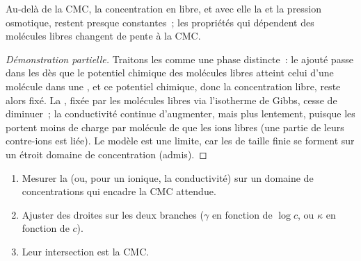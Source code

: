 \begin{proposition}\label{prop:b3:colloids:cmc-break}
Au-delà de la CMC, la concentration en  libre, et avec elle
la  et la pression osmotique, restent presque
constantes~; les propriétés qui dépendent des molécules libres changent
de pente à la CMC.
\end{proposition}

\begin{proof}[Démonstration partielle]
Traitons les  comme une phase distincte~: le  ajouté
passe dans les  dès que le potentiel chimique des molécules
libres atteint celui d'une molécule dans une , et ce potentiel
chimique, donc la concentration libre, reste alors fixé. La , fixée par les molécules libres via l'isotherme de Gibbs,
cesse de diminuer~; la conductivité continue d'augmenter, mais plus
lentement, puisque les  portent moins de charge par molécule de
 que les ions libres (une partie de leurs contre-ions est
liée). Le modèle est une limite, car les  de taille finie se
forment sur un étroit domaine de concentration (admis).
\end{proof}

\begin{method}\label{met:b3:colloids:cmc}
\begin{enumerate}
  \item Mesurer la  (ou, pour un 
        ionique, la conductivité) sur un domaine de concentrations qui
        encadre la CMC attendue.
  \item Ajuster des droites sur les deux branches ($\gamma$ en fonction de
        $\log c$, ou $\kappa$ en fonction de $c$).
  \item Leur intersection est la CMC.
\end{enumerate}
\end{method}

